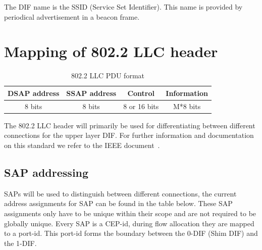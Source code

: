 The DIF name is the SSID (Service Set Identifier). This name is provided by periodical advertisement in a beacon frame.


\section{Mapping of 802.2 LLC header}

\begin{table}[H]
		\begin{center}
		\begin{tabular}{|c|c|c|c|}
			\hline
				\textbf{DSAP address} & \textbf{SSAP address} & \textbf{Control} & \textbf{Information} \\ \hline
				8 bits & 8 bits & 8 or 16 bits & M*8 bits \\ 
			\hline
		\end{tabular}
		\caption{802.2 LLC PDU format}
		\end{center}
\end{table}

The 802.2 LLC header will primarily be used for differentiating between different connections for the upper layer DIF. For further information and documentation on this standard we refer to the IEEE document~\citep{ieee8022std}.

\subsection{SAP addressing}
\label{ssec:sap-addressing}

SAPs will be used to distinguish between different connections, the current address assignments for SAP can be found in the table below. These SAP assignments only have to be unique within their scope and are not required to be globally unique. Every SAP is a CEP-id, during flow allocation they are mapped to a port-id. This port-id forms the boundary between the 0-DIF (Shim DIF) and the 1-DIF.

\npar

